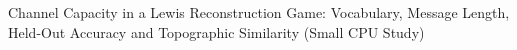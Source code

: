 Channel Capacity in a Lewis Reconstruction Game: Vocabulary, Message Length, Held-Out Accuracy and Topographic Similarity (Small CPU Study)
